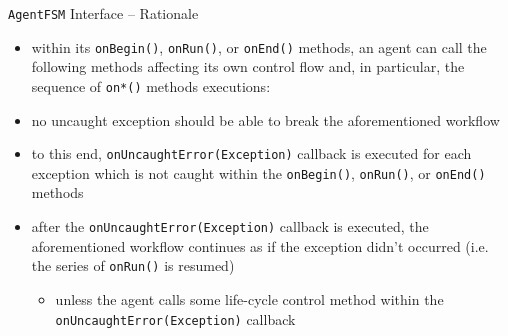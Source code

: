 \documentclass[presentation]{beamer}\mode<presentation>{\usetheme{AMSCesenaPurpleAndGold}}
\begin{document}
\begin{frame}[allowframebreaks]{\texttt{AgentFSM} Interface -- Rationale}
\begin{itemize}
        \bigskip

        \item within its \texttt{onBegin()}, \texttt{onRun()}, or \texttt{onEnd()} methods, an agent can call the following methods affecting its own control flow and, in particular, the sequence of \texttt{on*()} methods executions:

        \framebreak

        \item \alert{no uncaught exception} should be able to break the aforementioned workflow

        \bigskip

        \item to this end, \texttt{\alert{onUncaughtError(Exception)}} callback is executed for each exception which is not caught within the \texttt{onBegin()}, \texttt{onRun()}, or \texttt{onEnd()} methods

        \bigskip

        \item after the \texttt{onUncaughtError(Exception)} callback is executed, the aforementioned workflow continues as if the exception didn't occurred (i.e. the series of \texttt{onRun()} is resumed)
        \begin{itemize}
            \item unless the agent calls some life-cycle control method within the \texttt{onUncaughtError(Exception)} callback
        \end{itemize}
    \end{itemize}
\end{frame}
\end{document}
